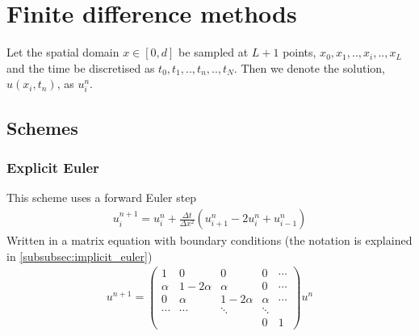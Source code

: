 \documentclass[11pt,a4paper,draft]{article}
\numberwithin{equation}{section}
\begin{document}


\section{Finite difference methods}

Let the spatial domain $x \in [0,d]$ be sampled at $L+1$ points, $x_0,x_1,..,x_i,..,x_L$ and the time be discretised as $t_0,t_1,..,t_n,..,t_N$. Then we denote the solution, $u(x_i,t_n)$, as $u_i^n$.  

\subsection{Schemes}

\subsubsection{Explicit Euler}
This scheme uses a forward Euler step
\begin{gather}
u_i^{n+1} = u_i^n + \frac{\Delta t}{\Delta x^2}\left(
u_{i+1}^n - 2u_i^n + u_{i-1}^n
\right)
\end{gather}
Written in a matrix equation with boundary conditions (the notation 
is explained in \ref{subsubsec:implicit_euler})
\begin{gather}
u^{n+1} = 
\begin{pmatrix}
1 & 0 & 0 & 0 & \cdots\\
\alpha & 1 - 2\alpha & \alpha & 0 & \cdots\\
0 & \alpha & 1-2\alpha & \alpha & \cdots\\
\cdots & \cdots & \ddots & \ddots& \\
&&& 0 & 1
\end{pmatrix}u^n
\end{gather}
\end{document}
